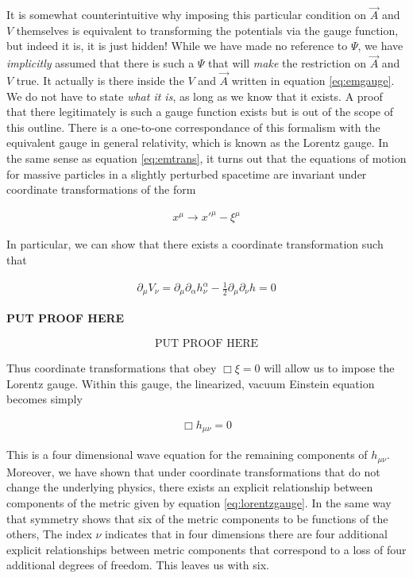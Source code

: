 It is somewhat counterintuitive why imposing this particular condition on $\vec{A}$ and $V$ themselves is equivalent to transforming the potentials via the gauge function, but indeed it is, it is just hidden! While we have made no reference to $\Psi$, we have \textit{implicitly} assumed that there is such a $\Psi$ that will \textit{make} the restriction on $\vec{A}$ and $V$ true. It actually is there inside the $V$ and $\vec{A}$ written in equation \ref{eq:emgauge}. We do not have to state \textit{what it is}, as long as we know that it exists. A proof that there legitimately is such a gauge function exists but is out of the scope of this outline. 
There is a one-to-one correspondance of this formalism with the equivalent gauge in general relativity, which is known as the Lorentz gauge. In the same sense as equation \ref{eq:emtrans}, it turns out that the equations of motion for massive particles in a slightly perturbed spacetime are invariant under coordinate transformations of the form  

\begin{align}
x^{\mu} \rightarrow x'^{\mu} - \xi^{\mu}
\end{align}

In particular, we can show that there exists a coordinate transformation such that 

\begin{align}
\partial_{\mu}V_{\nu} = \partial_{\mu}\partial_{\alpha}h^{\alpha}_{\nu} - \frac{1}{2}\partial_{\mu}\partial_{\nu}h = 0
\end{align} 

\textbf{PUT PROOF HERE}

\begin{align}
\text{PUT PROOF HERE}
\end{align}

Thus coordinate transformations that obey $\Box \xi = 0$ will allow us to impose the Lorentz gauge. Within this gauge, the linearized, vacuum Einstein equation becomes simply

\begin{align}\label{eq:flteinst}
\Box h_{\mu \nu} = 0
\end{align}

This is a four dimensional wave equation for the remaining components of $h_{\mu \nu}$. Moreover, we have shown that under coordinate transformations that do not change the underlying physics, there exists an explicit relationship between components of the metric given by equation \ref{eq:lorentzgauge}. In the same way that symmetry shows that six of the metric components to be functions of the others, The index $\nu$ indicates that in four dimensions there are four additional explicit relationships between metric components that correspond to a loss of four additional degrees of freedom. This leaves us with six.  





